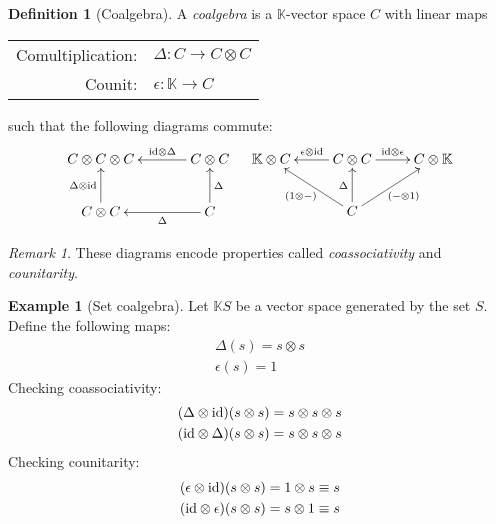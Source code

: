 \documentclass[svgnames]{article}
\theoremstyle{definition}
\newtheorem{Definition}{Definition}
\newtheorem{Example}{Example}
\theoremstyle{remark}
\newtheorem*{Remark*}{Remark}
\theoremstyle{underline}
\theoremstyle{underline}
\newcommand{\id}{\mathrm{id}}
\begin{document}
	\begin{Definition}[Coalgebra]
		A \emph{coalgebra} is a $\mathbb K$-vector space $C$ with linear maps
		\begin{center}
			\begin{tabular}{rl}
		 		Comultiplication: & $\Delta \colon C \rightarrow C \otimes C$ \\
		 		Counit: & $ \epsilon \colon \mathbb K \rightarrow C$ 
		\end{tabular}
		\end{center}
		such that the following diagrams commute:
		\begin{align*}
		\xymatrix@!C{
			C \otimes C \otimes C & C \otimes C \ar[l]_-{\id \otimes \Delta} \\
			C \otimes C \ar[u]^-{\Delta \otimes \id} & C \ar[l]^-{\Delta} \ar[u]_-{\Delta}
		} & &
		\xymatrix@!C{
			\mathbb K \otimes C  & C \otimes C \ar[l]_-{\epsilon \otimes \id} \ar[r]^-{\id \otimes \epsilon} & C \otimes \mathbb K  \\
			& C \ar[u]^-{\Delta} \ar[lu]^-{\pqty{1 \otimes -}} \ar[ru]_-{\pqty{- \otimes 1}} &	
		}
		\end{align*}
	\end{Definition}
	\begin{Remark*}
		These diagrams encode properties called \emph{coassociativity} and \emph{counitarity}.
	\end{Remark*}
	\begin{Example}[Set coalgebra]
		Let $\mathbb K S$ be a vector space generated by the set $S$. Define the following maps:
		\begin{gather*}
			\Delta(s) = s\otimes s \\
			\epsilon(s) = 1 
		\end{gather*}
		Checking coassociativity:
		\begin{gather*}
			\pqty{\Delta \otimes \id} \pqty{s \otimes s} = s \otimes s \otimes s \\
			\pqty{\id \otimes \Delta} \pqty{s \otimes s} = s \otimes s \otimes s 
		\end{gather*}
		Checking counitarity:
		\begin{gather*}
			\pqty{\epsilon \otimes \id} \pqty{s \otimes s} = 1 \otimes s \equiv s \\
			\pqty{\id \otimes \epsilon} \pqty{s \otimes s} = s \otimes 1 \equiv s
		\end{gather*}
	\end{Example}
\end{document}
